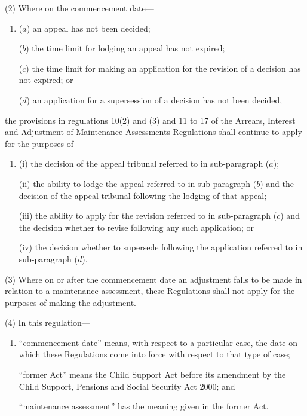 \documentclass[12pt,a4paper]{article}
\begin{document}
(2) Where on the commencement date—
\begin{enumerate}\item[]
($a$) an appeal has not been decided;

($b$) the time limit for lodging an appeal has not expired;

($c$) the time limit for making an application for the revision of a decision has not expired; or

($d$) an application for a supersession of a decision has not been decided,
\end{enumerate}
the provisions in regulations 10(2) and (3) and 11 to 17 of the Arrears, Interest and Adjustment of Maintenance Assessments Regulations shall continue to apply for the purposes of—
\begin{enumerate}\item[]
(i) the decision of the appeal tribunal referred to in sub-paragraph ($a$);

(ii) the ability to lodge the appeal referred to in sub-paragraph ($b$)  and the decision of the appeal tribunal following the lodging of that appeal;

(iii) the ability to apply for the revision referred to in sub-paragraph ($c$)  and the decision whether to revise following any such application; or

(iv) the decision whether to supersede following the application referred to in sub-paragraph ($d$).
\end{enumerate}

(3) Where on or after the commencement date an adjustment falls to be made in relation to a maintenance assessment, these Regulations shall not apply for the purposes of making the adjustment.

(4) In this regulation—
\begin{enumerate}\item[]
    “commencement date” means, with respect to a particular case, the date on which these Regulations come into force with respect to that type of case;

    “former Act” means the Child Support Act before its amendment by the Child Support, Pensions and Social Security Act 2000; and

    “maintenance assessment” has the meaning given in the former Act. 
\end{enumerate}

\end{document}
